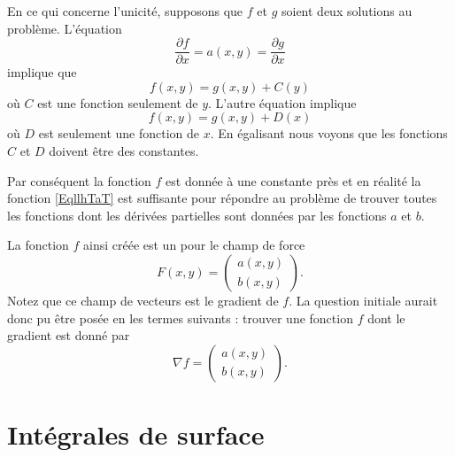 En ce qui concerne l'unicité, supposons que \( f\) et \( g\) soient deux solutions au problème. L'équation
\begin{equation}
    \frac{ \partial f }{ \partial x }=a(x,y)=\frac{ \partial g }{ \partial x }
\end{equation}
implique que 
\begin{equation}
    f(x,y)=g(x,y)+C(y)
\end{equation}
où \( C\) est une fonction seulement de \( y\). L'autre équation implique
\begin{equation}
    f(x,y)=g(x,y)+D(x)
\end{equation}
où \( D\) est seulement une fonction de \( x\). En égalisant nous voyons que les fonctions \( C\) et \( D\) doivent être des constantes.

Par conséquent la fonction \( f\) est donnée à une constante près et en réalité la fonction \eqref{EqllhTaT} est suffisante pour répondre au problème de trouver toutes les fonctions dont les dérivées partielles sont données par les fonctions \( a\) et \( b\).

La fonction \( f\) ainsi créée est un  pour le champ de force
\begin{equation}
    F(x,y)=\begin{pmatrix}
        a(x,y)    \\ 
        b(x,y)  
    \end{pmatrix}.
\end{equation}
Notez que ce champ de vecteurs est le gradient de \( f\). La question initiale aurait donc pu être posée en les termes suivants : trouver une fonction \( f\) dont le gradient est donné par
\begin{equation}
    \nabla f=\begin{pmatrix}
        a(x,y)    \\ 
        b(x,y)    
    \end{pmatrix}.
\end{equation}

\section{Intégrales de surface}

